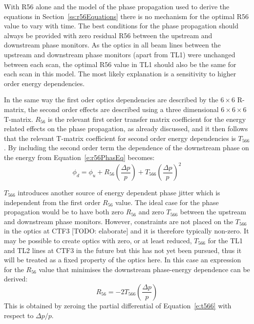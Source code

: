 With R56 alone and the model of the phase propagation used to derive the equations in Section~\ref{ss:r56Equations} there is no mechanism for the optimal R56 value to vary with time. The best conditions for the phase propagation should always be provided with zero residual R56 between the upstream and downstream phase monitors. As the optics in all beam lines between the upstream and downstream phase monitors (apart from TL1) were unchanged between each scan, the optimal R56 value in TL1 should also be the same for each scan in this model. The most likely explanation is a sensitivity to higher order energy dependencies.


In the same way the first oder optics dependencies are described by the \(6 \times 6\) R-matrix, the second order effects are described using a three dimensional \(6 \times 6 \times 6\) T-matrix. \(R_{56}\) is the relevant first order transfer matrix coefficient for the energy related effects on the phase propagation, as already discussed, and it then follows that the relevant T-matrix coefficient for second order energy dependencies is \(T_{566}\). By including the second order term the dependence of the downstream phase on the energy from Equation~\ref{e:r56PhasEq} becomes:
\begin{equation}
\phi_d = \phi_u + R_{56}\left(\frac{\Delta p}{p}\right) + T_{566}\left(\frac{\Delta p}{p}\right)^2
\label{e:t566}
\end{equation}

\(T_{566}\) introduces another source of energy dependent phase jitter which is independent from the first order \(R_{56}\) value. The ideal case for the phase propagation would be to have both zero \(R_{56}\) and zero \(T_{566}\) between the upstream and downstream phase monitors. However, constraints are not placed on the \(T_{566}\) in the optics at CTF3 [TODO: elaborate] and it is therefore typically non-zero. It may be possible to create optics with zero, or at least reduced, \(T_{566}\) for the TL1 and TL2 lines at CTF3 in the future but this has not yet been pursued, thus it will be treated as a fixed property of the optics here. In this case an expression for the \(R_{56}\) value that minimises the downstream phase-energy dependence can be derived:
\begin{equation}
R_{56} = -2T_{566} \left(\frac{\Delta p}{p}\right)
\label{e:r56t566dep}
\end{equation}
This is obtained by zeroing the partial differential of Equation~\ref{e:t566} with respect to \(\Delta p/p\).

